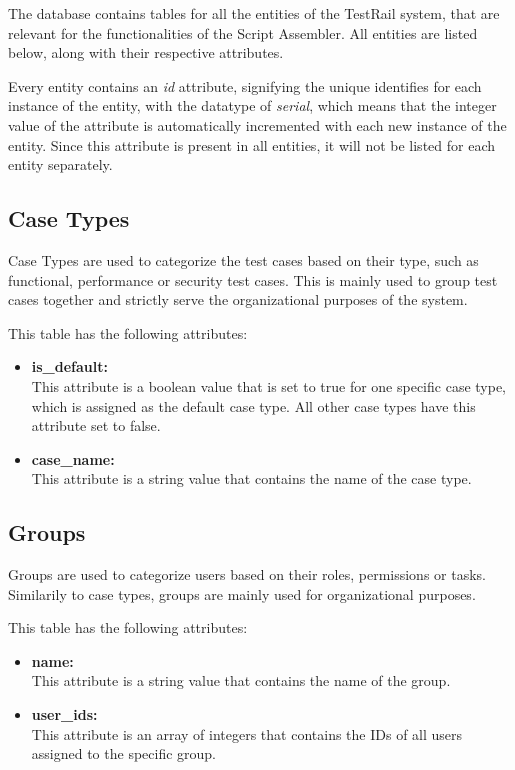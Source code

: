 The database contains tables for all the entities of the TestRail system, that are relevant for the functionalities of the Script Assembler. All entities are listed below, along with their respective attributes.

Every entity contains an \textit{id} attribute, signifying the unique identifies for each instance of the entity, with the datatype of \textit{serial}, which means that the integer value of the attribute is automatically incremented with each new instance of the entity. Since this attribute is present in all entities, it will not be listed for each entity separately.

\subsection{Case Types}

Case Types are used to categorize the test cases based on their type, such as functional, performance or security test cases. This is mainly used to group test cases together and strictly serve the organizational purposes of the system.

This table has the following attributes:~\cite{TRCaseTypes}
\begin{itemize}
    \item \textbf{is_default:} \\
    This attribute is a boolean value that is set to true for one specific case type, which is assigned as the default case type. All other case types have this attribute set to false.

    \item \textbf{case_name:} \\
    This attribute is a string value that contains the name of the case type.
\end{itemize}

\subsection{Groups}

Groups are used to categorize users based on their roles, permissions or tasks. Similarily to case types, groups are mainly used for organizational purposes.

This table has the following attributes:~\cite{TRGroups}
\begin{itemize}
    \item \textbf{name:} \\
    This attribute is a string value that contains the name of the group.

    \item \textbf{user_ids:} \\
    This attribute is an array of integers that contains the IDs of all users assigned to the specific group.
\end{itemize}

